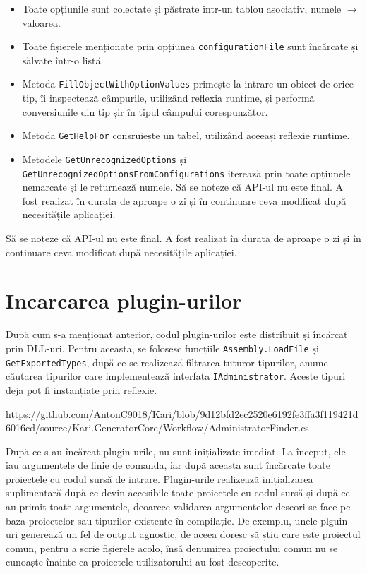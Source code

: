 \documentclass{report}
\begin{document}
\begin{itemize}
  \item Toate opțiunile sunt colectate și păstrate într-un tablou asociativ, numele $\rightarrow$ valoarea.
  \item Toate fișierele menționate prin opțiunea \texttt{configurationFile} sunt încărcate și sălvate într-o listă.
  \item Metoda \texttt{FillObjectWithOptionValues} primește la intrare un obiect de orice tip, îi inspectează câmpurile, utilizând reflexia runtime, și performă conversiunile din tip șir în tipul câmpului corespunzător.
  \item Metoda \texttt{GetHelpFor} consruiește un tabel, utilizând aceeași reflexie runtime.
  \item Metodele \texttt{GetUnrecognizedOptions} și \texttt{GetUnrecognizedOptionsFromConfigurations} iterează prin toate opțiunele nemarcate și le returnează numele.
  Să se noteze că API-ul nu este final.
  A fost realizat în durata de aproape o zi și în continuare ceva modificat după necesitățile aplicației.
\end{itemize}

Să se noteze că API-ul nu este final.
A fost realizat în durata de aproape o zi și în continuare ceva modificat după necesitățile aplicației.


\section{Incarcarea plugin-urilor}

După cum s-a menționat anterior, codul plugin-urilor este distribuit și încărcat prin DLL-uri.
Pentru aceasta, se folosesc funcțiile \texttt{Assembly.LoadFile} și \texttt{GetExportedTypes}, după ce se realizează filtrarea tuturor tipurilor, anume căutarea tipurilor care implementează interfața \texttt{IAdministrator}.
Aceste tipuri deja pot fi instanțiate prin reflexie.

https://github.com/AntonC9018/Kari/blob/9d12bfd2ec2520e6192fe3ffa3f119421d6016cd/source/Kari.GeneratorCore/Workflow/AdministratorFinder.cs

După ce s-au încărcat plugin-urile, nu sunt inițializate imediat.
La început, ele iau argumentele de linie de comanda, iar după aceasta sunt încărcate toate proiectele cu codul sursă de intrare.
Plugin-urile realizează inițializarea suplimentară după ce devin accesibile toate proiectele cu codul sursă și după ce au primit toate argumentele, deoarece validarea argumentelor deseori se face pe baza proiectelor sau tipurilor existente în compilație.
De exemplu, unele plguin-uri generează un fel de output agnostic, de aceea doresc să știu care este proiectul comun, pentru a scrie fișierele acolo, însă denumirea proiectului comun nu se cunoaște înainte ca proiectele utilizatorului au fost descoperite.
\end{document}
